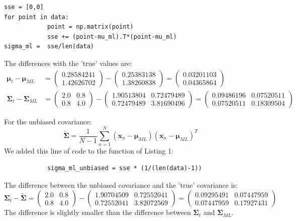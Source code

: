 \documentclass[a4paper,10pt]{article}
\numberwithin{equation}{section} %
\numberwithin{figure}{section} %
\numberwithin{table}{section} %
\theoremstyle{mytheor}
\begin{document}
\begin{enumerate}
\begin{lstlisting}[label={list:first},caption=Python code to calculate $\boldsymbol \mu_{ML}$ and $\boldsymbol \Sigma_{ML}$.]
sse = [0,0]
for point in data:
        	point = np.matrix(point)
        	sse += (point-mu_ml).T*(point-mu_ml)
sigma_ml =  sse/len(data)
    		\end{lstlisting}
    		The differences with the 'true' values are:
    		\begin{align}
    		\boldsymbol \mu_t - \boldsymbol \mu_{ML} &= \begin{pmatrix} 0.28584241 \\ 1.42626702\end{pmatrix} - \begin{pmatrix} 0.25383138\\ 1.38260838 \end{pmatrix} = \begin{pmatrix} 0.03201103\\ 0.04365864 \end{pmatrix}\\
    		\boldsymbol \Sigma_t - \boldsymbol \Sigma_{ML} &= \begin{pmatrix} 2.0 & 0.8\\ 0.8 & 4.0 \end{pmatrix} - \begin{pmatrix} 1.90513804 & 0.72479489\\ 0.72479489 & 3.81690496 \end{pmatrix} = \begin{pmatrix} 0.09486196 & 0.07520511\\ 0.07520511 & 0.18309504 \end{pmatrix}
		\end{align}
\end{enumerate}
		For the unbiased covariance:
		\begin{equation}
		\boldsymbol {\tilde \Sigma} = \frac{1}{N-1} \sum_{n=1}^N (\boldsymbol x_n - \boldsymbol \mu_{ML})(\boldsymbol x_n - \boldsymbol \mu_{ML})^T \tag{Bishop 2.125}
		\end{equation}
		We added this line of code to the function of Listing 1:
		\begin{verbatim}
			sigma_ml_unbiased = sse * (1/(len(data)-1))
		\end{verbatim}
		The difference between the unbiased covariance and the 'true' covariance is:
		\begin{equation} 
		\boldsymbol \Sigma_t - \boldsymbol{\tilde \Sigma} = \begin{pmatrix} 2.0 & 0.8\\ 0.8 & 4.0 \end{pmatrix} - \begin{pmatrix} 1.90704509 & 0.72552041\\ 0.72552041 & 3.82072569 \end{pmatrix} = \begin{pmatrix} 0.09295491 & 0.07447959\\ 0.07447959 & 0.17927431 \end{pmatrix}
		\end{equation}
		The difference is slightly smaller than the difference between $\boldsymbol \Sigma_t$ and $\boldsymbol \Sigma_{ML}$. 
\end{document}
